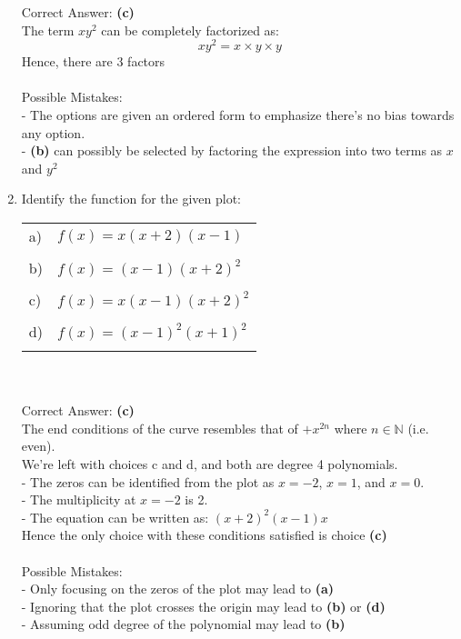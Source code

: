 \documentclass[11pt]{article}
\newcommand{\choice}[1]{\textbf{(#1)}}
\begin{document}
\begin{enumerate}[(1),wide,nosep, label={\bfseries \arabic*)}]
Correct Answer: \choice c \\
The term $xy^2$ can be completely factorized as:
$$xy^2 = x \times y \times y$$
Hence, there are 3 factors \\\\

Possible Mistakes:\\
- The options are given an ordered form to emphasize there's no bias towards any option.\\
- \choice b can possibly be selected by factoring the expression into two terms as $x$ and $y^2$ 
\newpage
\item Identify the function for the given plot:
\begin{figure}[H]
	\centering
\end{figure}
\begin{tabular}{ll}
a)&$f(x)=x(x+2)(x-1)$\\\\
b)&$f(x)=(x-1)(x+2)^2$\\\\
c)&$f(x)=x(x-1)(x+2)^2$\\\\
d)&$f(x)=(x-1)^2(x+1)^2$\\\\
\end{tabular}\\\\

Correct Answer: \choice c\\
The end conditions of the curve resembles that of $+x^{2n}$ where $n \in \mathbb{N}$ (i.e. even).\\
We're left with choices c and d, and both are degree 4 polynomials.\\
- The zeros can be identified from the plot as $x=-2$, $x=1$, and $x=0$.\\
- The multiplicity at $x=-2$ is 2.\\
- The equation can be written as: $(x+2)^2(x-1)x$\\
Hence the only choice with these conditions satisfied is choice \choice c\\\\

Possible Mistakes:\\
- Only focusing on the zeros of the plot may lead to \choice a\\
- Ignoring that the plot crosses the origin may lead to \choice b or \choice d\\
- Assuming odd degree of the polynomial may lead to \choice b

\newpage


\end{enumerate}
\end{document}
